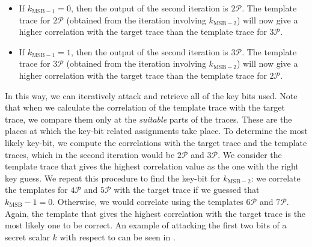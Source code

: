 %
\begin{itemize}
	\item  If $k_{\text{MSB} - 1} = 0$, then the output of the second iteration is $2 \mathcal{P}$. The template trace for $2\mathcal{P}$ (obtained from the iteration involving $k_{\text{MSB} - 2}$) will now give a higher correlation with the target trace than the template trace for $3\mathcal{P}$.
	
	\item If $k_{\text{MSB} - 1} = 1$, then the output of the second iteration is $3 \mathcal{P}$. The template trace for $3\mathcal{P}$ (obtained from the iteration involving $k_{\text{MSB} - 2}$) will now give a higher correlation with the target trace than the template trace for $2\mathcal{P}$.
\end{itemize}
%
In this way, we can iteratively attack and retrieve all of the key bits used.
Note that when we calculate the correlation of the template trace with the target trace, we compare them only at the \emph{suitable} parts of the traces. 
These are the places at which the key-bit related assignments take place.
To determine the most likely key-bit, we compute the correlations with the target trace and the template traces, which in the second iteration would be $2\mathcal{P}$ and $3\mathcal{P}$. 
We consider the template trace that gives the highest correlation value as the one with the right key guess.
We repeat this procedure to find the key-bit for $k_{\text{MSB} - 2}$: we correlate the templates for $4\mathcal{P}$ and $5\mathcal{P}$ with the target trace if we guessed that $k_\text{MSB} - 1 = 0$.
Otherwise, we would correlate using the templates $6\mathcal{P}$ and $7\mathcal{P}$.
Again, the template that gives the highest correlation with the target trace is the most likely one to be correct.
An example of attacking the first two bits of a secret scalar $k$ with respect to  can be seen in .
%
